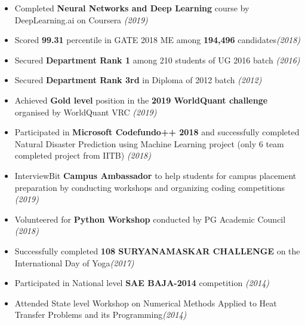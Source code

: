 \documentclass[a4paper,10pt]{article}
\begin{document}
\begin{itemize}[noitemsep,nolistsep]
\setlength\itemsep{0.0001em}
    \item Completed \textbf{Neural Networks and Deep Learning} course by DeepLearning.ai on Coursera \hfill\emph{(2019)}
    \item Scored \textbf{99.31} percentile in GATE 2018 ME among \textbf{194,496} candidates\hfill\emph{(2018)}
    \item Secured \textbf{Department Rank 1} among 210 students of UG 2016 batch \hfill\emph{(2016)}
     \item Secured \textbf{Department Rank 3rd} in Diploma of 2012 batch \hfill\emph{(2012)}
    \item Achieved \textbf{Gold level} position in the \textbf{2019 WorldQuant challenge} organised by WorldQuant VRC \hfill\emph{(2019)}
    \item Participated in \textbf{Microsoft Codefundo++ 2018} and successfully completed Natural Disaster Prediction using Machine Learning project (only 6 team completed project from IITB) \hfill\emph{(2018)}
    \item InterviewBit \textbf{Campus Ambassador} to help students for campus placement preparation by conducting workshops and organizing coding competitions \hfill\emph{(2019)}
    \item Volunteered for \textbf{Python Workshop} conducted by PG Academic Council \hfill\emph{(2018)}
    \item Successfully completed \textbf{108 SURYANAMASKAR CHALLENGE} on the International Day of Yoga\hfill\emph{(2017)}
    \item Participated in National level \textbf{SAE BAJA-2014} competition \hfill\emph{(2014)}
    \item Attended State level Workshop on Numerical Methods Applied to Heat Transfer Problems and its Programming\hfill\emph{(2014)}

\end{itemize}
\end{document}
